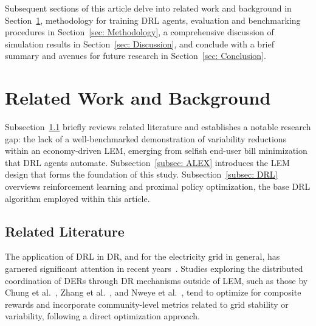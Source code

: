 \documentclass[preprint, 12pt]{elsarticle}
\begin{document}

Subsequent sections of this article delve into related work and background in Section~\ref{sec: Related Lit and Background}, methodology for training DRL agents, evaluation and benchmarking procedures in Section~\ref{sec: Methodology}, a comprehensive discussion of simulation results in Section~\ref{sec: Discussion}, and conclude with a brief summary and avenues for future research in Section~\ref{sec: Conclusion}.


\section{Related Work and Background}\label{sec: Related Lit and Background}

Subsection~\ref{subsec: Related Lit} briefly reviews related literature and establishes a notable research gap: the lack of a well-benchmarked demonstration of variability reductions within an economy-driven LEM, emerging from selfish end-user bill minimization that DRL agents automate.
Subsection~\ref{subsec: ALEX} introduces the LEM design that forms the foundation of this study.
Subsection~\ref{subsec: DRL} overviews reinforcement learning and proximal policy optimization, the base DRL algorithm employed within this article.

\subsection{Related Literature}\label{subsec: Related Lit}

The application of DRL in DR, and for the electricity grid in general, has garnered significant attention in recent years~\cite{VCReview, cao2020_DRLInPower_Review, perera2021_DRL_InEnergy}. Studies exploring the distributed coordination of DERs through DR mechanisms outside of LEM, such as those by Chung et al.~\cite{Chung_NoLEM_Article}, Zhang et al.~\cite{Zhang_NoLEM_Article}, and Nweye et al.~\cite{Nweye_DR_DRL_Article_citylearn}, tend to optimize for composite rewards and incorporate community-level metrics related to grid stability or variability, following a direct optimization approach.  
\end{document}

